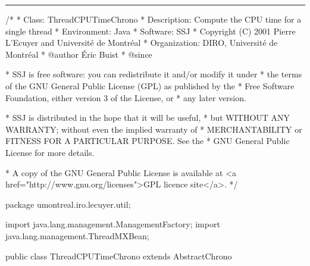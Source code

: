 \bigskip\hrule
\begin{code}
\begin{hide}
/*
 * Class:        ThreadCPUTimeChrono
 * Description:  Compute the CPU time for a single thread
 * Environment:  Java
 * Software:     SSJ 
 * Copyright (C) 2001  Pierre L'Ecuyer and Université de Montréal
 * Organization: DIRO, Université de Montréal
 * @author       Éric Buist
 * @since

 * SSJ is free software: you can redistribute it and/or modify it under
 * the terms of the GNU General Public License (GPL) as published by the
 * Free Software Foundation, either version 3 of the License, or
 * any later version.

 * SSJ is distributed in the hope that it will be useful,
 * but WITHOUT ANY WARRANTY; without even the implied warranty of
 * MERCHANTABILITY or FITNESS FOR A PARTICULAR PURPOSE.  See the
 * GNU General Public License for more details.

 * A copy of the GNU General Public License is available at
   <a href="http://www.gnu.org/licenses">GPL licence site</a>.
 */
\end{hide}
package umontreal.iro.lecuyer.util;\begin{hide}

import java.lang.management.ManagementFactory;
import java.lang.management.ThreadMXBean;\end{hide}


public class ThreadCPUTimeChrono extends AbstractChrono\begin{hide} {
   private  long           myThreadId;
   static   ThreadMXBean   threadMXBean = null;

   protected void getTime (long[] tab) {
      long rawTime = getTime();
      final long DIV = 1000000000L;
      long seconds = rawTime/DIV;
      long micros = (rawTime %
      tab[0] = seconds;
      tab[1] = micros;
   }

   protected long getTime() {
      if (threadMXBean == null) {
         // We use lazy initialization to avoid a potential exception being wrapped into a confusing
         // ExceptionInInitializerError. That would happen if this initialization was in a static block instead of
         // in this method.
         threadMXBean = ManagementFactory.getThreadMXBean();
         if (!threadMXBean.isThreadCpuTimeEnabled())
            // Call this only when necessary, because this can throw a SecurityException if
            // run under a security manager.
            threadMXBean.setThreadCpuTimeEnabled (true);
      }
      long time = threadMXBean.getThreadCpuTime(myThreadId);
      return time < 0 ? 0 : time;
   }\end{hide}
\end{code}

